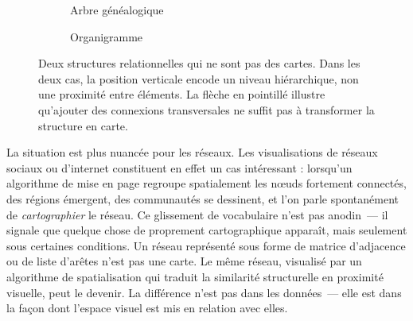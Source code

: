 \begin{figure}[ht]
  \centering
  \begin{subfigure}
    [b]{0.42\textwidth}
    \centering
    \caption{Arbre généalogique}
  \end{subfigure}
  \hfill
  \begin{subfigure}
    [b]{0.52\textwidth}
    \centering
    \caption{Organigramme}
  \end{subfigure}
  \caption{Deux structures relationnelles qui ne sont pas des cartes. Dans les deux
  cas, la position verticale encode un niveau hiérarchique, non une proximité entre
  éléments. La flèche en pointillé illustre qu'ajouter des connexions
  transversales ne suffit pas à transformer la structure en carte.}
  \label{fig:arbre_organigramme}
\end{figure}

La situation est plus nuancée pour les réseaux. Les visualisations de réseaux
sociaux ou d'internet constituent en effet un cas intéressant : lorsqu'un
algorithme de mise en page regroupe spatialement les n\oe{}uds fortement connectés,
des régions émergent, des communautés se dessinent, et l'on parle spontanément
de \emph{cartographier} le réseau. Ce glissement de vocabulaire n'est pas anodin~---
il signale que quelque chose de proprement cartographique apparaît, mais seulement
sous certaines conditions. Un réseau représenté sous forme de matrice d'adjacence
ou de liste d'arêtes n'est pas une carte. Le même réseau, visualisé par un
algorithme de spatialisation qui traduit la similarité structurelle en proximité
visuelle, peut le devenir. La différence n'est pas dans les données~--- elle est
dans la façon dont l'espace visuel est mis en relation avec elles.

